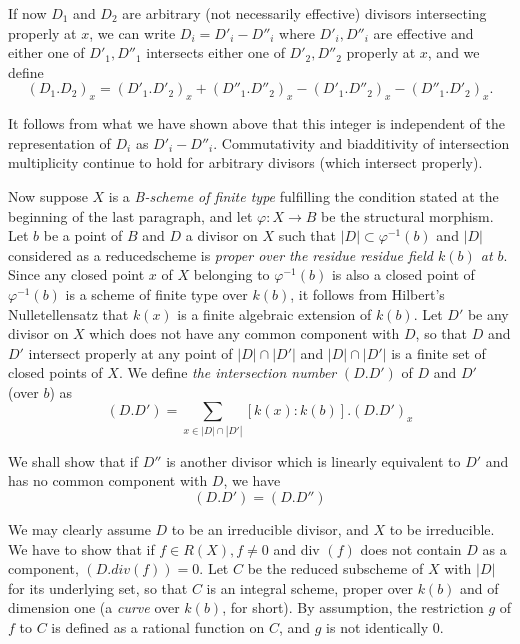 If now $D_1$ and $D_2$ are arbitrary (not necessarily effective)
divisors intersecting properly at $x$, we can write $D_i = D'_i -
D''_i$ where $D'_i, D''_i$ are effective and either one of $D'_1,
D''_1$ intersects either one of $D'_2, D''_2$ properly at $x$, and we
define 
$$
(D_1.D_2)_x = (D'_1. D'_2)_x + (D''_1. D''_2)_x -
(D'_1.D''_2)_x - (D''_1.D'_2)_x. 
$$

It follows from what we have shown above that this integer is
independent of the representation of $D_i$ as
$D'_i - D''_i$. Commutativity and biadditivity of intersection
multiplicity continue to hold for arbitrary divisors (which intersect
properly). 

Now suppose $X$ is a \textit{ B-scheme of finite type } fulfilling the
condition stated at the beginning  of the last paragraph, and let $\varphi
: X \to B$ be the structural morphism. Let $b$ be a point of $B$ and
$D$ a divisor on $X$ such that $|D|\subset \varphi^{-1}(b)$  and $|D|$
considered as a reduced\pageoriginale  scheme is \textit{proper over
  the residue 
  residue field $k(b)$ at $b$}. Since any closed point $x$ of $X$
belonging to $\varphi^{-1}(b)$ is also a closed point of
$\varphi^{-1}(b)$ is a scheme of finite type over $k(b)$, it follows
from Hilbert's Nulletellensatz that $k(x)$ is a finite algebraic
extension of $k(b)$. Let $D'$ be any divisor on $X$ which does not
have any common component with $D$, so that $D$ and $D'$ intersect
properly at any point of $|D|\cap|D'|$ and $|D|\cap|D'|$ is a finite
set of closed points of $X$. We define \textit{the intersection
  number} $(D. D')$ of $D$ and $D'$ (over $b$) as 
\begin{equation*}
  (D. D')= \sum_{x \in |D|\cap|D'|}[k(x) : k(b)]. (D. D')_x
  \tag{3}\label{chap6:eq3} 
\end{equation*}

We shall show that if $D''$ is another divisor which is linearly
equivalent to $D'$ and has no common component with $D$, we have 
\begin{equation*}
(D. D')=(D. D'')\tag{4}\label{chap6:eq4}
\end{equation*}

We may clearly assume $D$ to be an irreducible divisor, and $X$ to be
irreducible. We have to show that if $f \in R(X), f \neq 0$ and div
$(f)$ does not contain $D$ as a component, $(D. div(f)) = 0$. Let $C$
be the reduced subscheme of $X$ with $|D|$ for its underlying set, so
that $C$ is an integral scheme, proper over $k(b)$ and of dimension
one (a \textit{ curve } over $k(b)$, for short). By assumption, the
restriction $g$ of $f$ to $C$ is defined as a rational function on
$C$, and $g$ is not identically $0$. 

